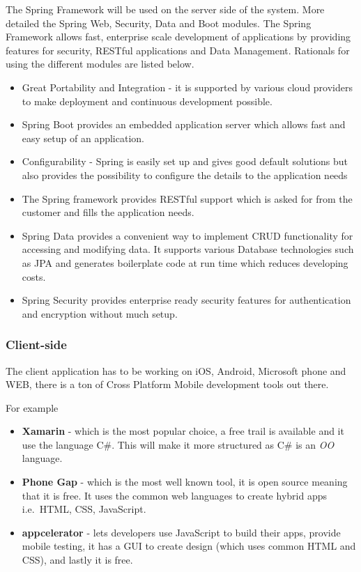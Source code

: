 \documentclass[a4paper,11pt]{article}
\begin{document}
The Spring Framework will be used on the server side of the system. More detailed the Spring Web, Security, Data and Boot modules.
The Spring Framework allows fast, enterprise scale development of applications by providing features for security, RESTful applications and Data Management. Rationals for using the different modules are listed below.
\begin{itemize}
\item Great Portability and Integration - it is supported by various cloud providers to make deployment and continuous development possible.
\item Spring Boot provides an embedded application server which allows fast and easy setup of an application.
\item Configurability - Spring is easily set up and gives good default solutions but also provides the possibility to configure the details to the application needs
\item The Spring framework provides RESTful support which is asked for from the customer and fills the application needs.
\item Spring Data provides a convenient way to implement CRUD functionality for accessing and modifying data. It supports various Database technologies such as JPA and generates boilerplate code at run time which reduces developing costs.
\item Spring Security provides enterprise ready security features for authentication and encryption without much setup.
\end{itemize}

\subsubsection{Client-side}


\noindent The client application has to be working on iOS, Android, Microsoft
phone and WEB, there is a ton of Cross Platform Mobile development tools
out there.

\noindent For example

\begin{itemize}
\item
  \textbf{Xamarin} - which is the most popular choice, a free trail is
  available and it use the language C\#. This will make it more
  structured as C\# is an \emph{OO} language.
\item
  \textbf{Phone Gap} - which is the most well known tool, it is open
  source meaning that it is free. It uses the common web languages to
  create hybrid apps i.e.~HTML, CSS, JavaScript.
\item
  \textbf{appcelerator} - lets developers use JavaScript to build their
  apps, provide mobile testing, it has a GUI to create design (which
  uses common HTML and CSS), and lastly it is free.
\end{itemize}
\end{document}
